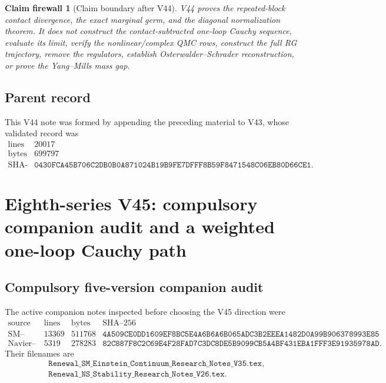 \documentclass[11pt,oneside]{book}
\newtheorem{firewall}[theorem]{Claim firewall}
\theoremstyle{definition}
\theoremstyle{remark}
\begin{document}
\begin{firewall}[Claim boundary after V44]
\label{fire:e8v44-claim}
V44 proves the repeated-block contact divergence, the exact marginal
germ, and the diagonal normalization theorem.  It does not construct
the contact-subtracted one-loop Cauchy sequence, evaluate its limit,
verify the nonlinear/complex QMC rows, construct the full RG
trajectory, remove the regulators, establish
Osterwalder--Schrader reconstruction, or prove the Yang--Mills mass
gap.
\end{firewall}

\subsection{Parent record}

This V44 note was formed by appending the preceding material to V43,
whose validated record was
\[
\begin{array}{c|c}
\text{lines}&20017\\
\text{bytes}&699797\\
\text{SHA-256}&
\texttt{0430FCA45B706C2DB0B0A871024B19B9FE7DFFF8B59F8471548C06EB80D66CE1}.
\end{array}
\]



\section{Eighth-series V45: compulsory companion audit and a
weighted one-loop Cauchy path}
\label{sec:e8v45}

\subsection{Compulsory five-version companion audit}

The active companion notes inspected before choosing the V45
direction were
\[
\begin{array}{c|r|r|l}
\text{source}&\text{lines}&\text{bytes}&\text{SHA--256}\\ \hline
\text{SM--Einstein V35}&13369&511768&
\texttt{4A509CE0DD1609EF8BC5E4A6B6A6B065ADC3B2EEEA1482D0A99B906378993E85}\\
\text{Navier--Stokes V26}&5319&278283&
\texttt{82C887F8C2C69E4F28FAD7C3DC8DE5B9099CB5A4BF431EBA1FFF3E91935978AD}.
\end{array}                                                     \tag{45.1}
\]
Their filenames are
\[
\begin{split}
&\texttt{Renewal\_SM\_Einstein\_Continuum\_Research\_Notes\_V35.tex},\\
&\texttt{Renewal\_NS\_Stability\_Research\_Notes\_V26.tex}.
\end{split}
\]
\end{document}
